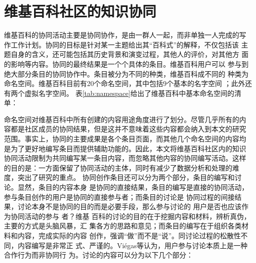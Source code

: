 \section{维基百科社区的知识协同}
维基百科的协同活动主要是协同协作，是由一群人一起，而非单独一人完成的写
作工作计划。协同的目标是针对某一主题给出其“百科式”的解释，不仅包括该
主题自身的含义，还可能包括其历史背景和演变过程，其他人的评价，对其他方
面的影响等内容。协同的最终结果是一个个具体的条目。维基百科用户可以
参与到绝大部分条目的协同协作中。条目被分为不同的种类，维基百科成不同的
种类为命名空间。维基百科目前有20个命名空间，其中包括9个基本的名字空间
；此外还有两个虚拟名字空间。
表\ref{tab:namespace}给出了维基百科中基本命名空间的清单：


命名空间对维基百科中所有创建的内容用途角度进行了划分。尽管几乎所有的内
容都是社区成员的协同结果，但是这并不意味着这些内容都会纳入到本文的研究
范围。事实上，协同的主要成果是各个条目页面，而其他几个命名空间的内容均
是为了更好地编写条目而提供辅助功能的。因此，本文将维基百科社区内的知识
协同活动限制为共同编写某一条目内容，而忽略其他内容的协同编写活动。这样
的目的是：一方面保留了协同活动的主体，同时有减少了数据分析和处理的难
度，突出了研究的重点。
协同创作条目还可以分为两个部分，条目的编写和讨论。显然，条目的内容本身
是协同的直接结果，条目的编写是直接的协同活动，参与条目创作的用户是协同的直接参与者；而条目的讨论是
协同过程的间接结果，讨论本身不是协同的目的而是必要手段，那么参与讨论的
用户是否也应该作为协同活动的参与
者？维基
百科的讨论的目的在于挖掘内容和材料，辨析真伪，主要的方式是头脑风暴，汇
集各方的思路和意见；而条目的编写在于组织各类材料和内容，完成实际的内容
创作，强调“做”而不是“说”。同讨论过程的松散性不同，内容编写是非常正
式、严谨的。Viégas等认为，用户参与讨论本质上是一种合作行为而非协同行
为。讨论的内容可以分为以下几个部分：




